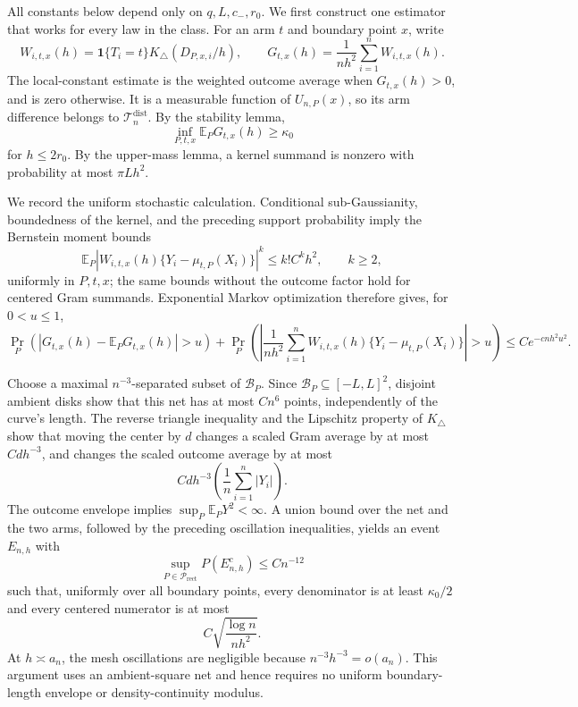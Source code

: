 All constants below depend only on \(q,L,c_-,r_0\).  We first construct one estimator that works for every law in the class.  For an arm \(t\) and boundary point \(x\), write
\[
W_{i,t,x}(h)=\mathbf1\{T_i=t\}K_\triangle(D_{P,x,i}/h),
\qquad
G_{t,x}(h)=\frac1{nh^2}\sum_{i=1}^nW_{i,t,x}(h).
\]
The local-constant estimate is the weighted outcome average when \(G_{t,x}(h)>0\), and is zero otherwise.  It is a measurable function of \(U_{n,P}(x)\), so its arm difference belongs to \(\mathcal T_n^{\mathrm{dist}}\).  By the stability lemma,
\[
\inf_{P,t,x}\mathbb E_PG_{t,x}(h)\geq\kappa_0
\]
for \(h\leq2r_0\).  By the upper-mass lemma, a kernel summand is nonzero with probability at most \(\pi Lh^2\).

We record the uniform stochastic calculation.  Conditional sub-Gaussianity, boundedness of the kernel, and the preceding support probability imply the Bernstein moment bounds
\[
\mathbb E_P|W_{i,t,x}(h)\{Y_i-\mu_{t,P}(X_i)\}|^k
\leq k!C^k h^2,
\qquad k\geq2,
\]
uniformly in \(P,t,x\); the same bounds without the outcome factor hold for centered Gram summands.  Exponential Markov optimization therefore gives, for \(0<u\leq1\),
\[
\Pr_P\!\left(\left|G_{t,x}(h)-\mathbb E_PG_{t,x}(h)\right|>u\right)
+\Pr_P\!\left(\left|\frac1{nh^2}\sum_{i=1}^nW_{i,t,x}(h)
\{Y_i-\mu_{t,P}(X_i)\}\right|>u\right)
\leq C e^{-cnh^2u^2}.
\]

Choose a maximal \(n^{-3}\)-separated subset of \(\mathcal B_P\).  Since \(\mathcal B_P\subseteq[-L,L]^2\), disjoint ambient disks show that this net has at most \(Cn^6\) points, independently of the curve's length.  The reverse triangle inequality and the Lipschitz property of \(K_\triangle\) show that moving the center by \(d\) changes a scaled Gram average by at most \(Cd h^{-3}\), and changes the scaled outcome average by at most
\[
Cd h^{-3}\left(\frac1n\sum_{i=1}^n|Y_i|\right).
\]
The outcome envelope implies \(\sup_P\mathbb E_PY^2<\infty\).  A union bound over the net and the two arms, followed by the preceding oscillation inequalities, yields an event \(E_{n,h}\) with
\[
\sup_{P\in\mathcal P_{\mathrm{rect}}}P(E_{n,h}^c)\leq Cn^{-12}
\]
such that, uniformly over all boundary points, every denominator is at least \(\kappa_0/2\) and every centered numerator is at most
\[
C\sqrt{\frac{\log n}{nh^2}}.
\]
At \(h\asymp a_n\), the mesh oscillations are negligible because \(n^{-3}h^{-3}=o(a_n)\).  This argument uses an ambient-square net and hence requires no uniform boundary-length envelope or density-continuity modulus.

